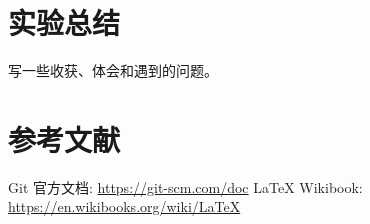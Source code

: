 \documentclass[UTF8]{ctexart}
\begin{document}
\section{实验总结}
写一些收获、体会和遇到的问题。

\section{参考文献}
\begin{thebibliography}{99}
 Git 官方文档: \url{https://git-scm.com/doc}
 LaTeX Wikibook: \url{https://en.wikibooks.org/wiki/LaTeX}
\end{thebibliography}
\end{document}
